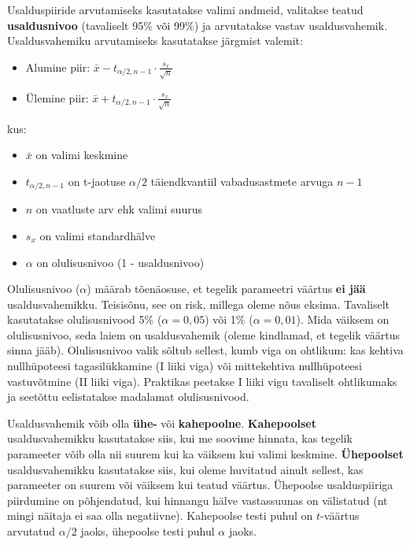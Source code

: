 \documentclass[
]{book}
\providecommand{\tightlist}{%
  \setlength{\itemsep}{0pt}\setlength{\parskip}{0pt}}
\begin{document}
Usalduspiiride arvutamiseks kasutatakse valimi andmeid, valitakse teatud \textbf{usaldusnivoo} (tavaliselt 95\% või 99\%) ja arvutatakse vastav usaldusvahemik. Usaldusvahemiku arvutamiseks kasutatakse järgmist valemit:

\begin{itemize}
\tightlist
\item
  Alumine piir: \(\bar{x} - t_{\alpha/2, n-1} \cdot \frac{s_x}{\sqrt{n}}\)
\item
  Ülemine piir: \(\bar{x} + t_{\alpha/2, n-1} \cdot \frac{s_x}{\sqrt{n}}\)
\end{itemize}

kus:

\begin{itemize}
\tightlist
\item
  \(\bar{x}\) on valimi keskmine
\item
  \(t_{\alpha/2, n-1}\) on t-jaotuse \(\alpha/2\) täiendkvantiil vabadusastmete arvuga \(n-1\)
\item
  \(n\) on vaatluste arv ehk valimi suurus
\item
  \(s_x\) on valimi standardhälve
\item
  \(\alpha\) on olulisusnivoo (1 - usaldusnivoo)
\end{itemize}

Olulisusnivoo (\(\alpha\)) määrab tõenäosuse, et tegelik parameetri väärtus \textbf{ei jää} usaldusvahemikku. Teisisõnu, see on risk, millega oleme nõus eksima. Tavaliselt kasutatakse olulisusnivood 5\% (\(\alpha = 0,05\)) või 1\% (\(\alpha = 0,01\)). Mida väiksem on olulisusnivoo, seda laiem on usaldusvahemik (oleme kindlamad, et tegelik väärtus sinna jääb). Olulisusnivoo valik sõltub sellest, kumb viga on ohtlikum: kas kehtiva nullhüpoteesi tagasilükkamine (I liiki viga) või mittekehtiva nullhüpoteesi vastuvõtmine (II liiki viga). Praktikas peetakse I liiki vigu tavaliselt ohtlikumaks ja seetõttu eelistatakse madalamat olulisusnivood.

Usaldusvahemik võib olla \textbf{ühe-} või \textbf{kahepoolne}. \textbf{Kahepoolset} usaldusvahemikku kasutatakse siis, kui me soovime hinnata, kas tegelik parameeter võib olla nii suurem kui ka väiksem kui valimi keskmine. \textbf{Ühepoolset} usaldusvahemikku kasutatakse siis, kui oleme huvitatud ainult sellest, kas parameeter on suurem või väiksem kui teatud väärtus. Ühepoolse usalduspiiriga piirdumine on põhjendatud, kui hinnangu hälve vastassuunas on välistatud (nt mingi näitaja ei saa olla negatiivne). Kahepoolse testi puhul on \(t\)-väärtus arvutatud \(\alpha/2\) jaoks, ühepoolse testi puhul \(\alpha\) jaoks.
\end{document}
